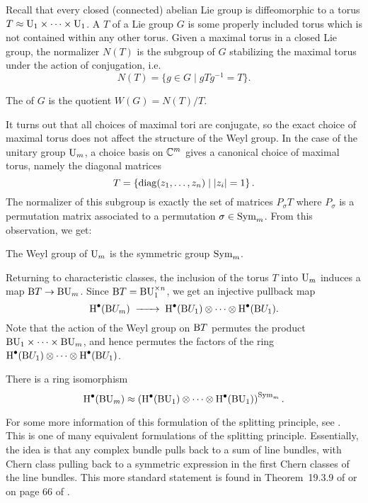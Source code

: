 Recall that every closed (connected) abelian Lie group is diffeomorphic to a torus $T \approx \mathrm{U}_1\times \cdots\times \mathrm{U}_1$. A  $T$ of a Lie group $G$ is some properly included torus which is not contained within any other torus. Given a maximal torus in a closed Lie group, the normalizer $N(T)$ is the subgroup of $G$ stabilizing the maximal torus under the action of conjugation, i.e. 
\[
	N(T) = \{ g \in G \mid gTg^{-1} = T\}.
\]
\begin{definition}
	The  of $G$ is the quotient $W(G)=N(T)/T$.
\end{definition}
It turns out that all choices of maximal tori are conjugate, so the exact choice of maximal torus does not affect the structure of the Weyl group.
In the case of the unitary group $\mathrm{U}_m$, a choice basis on $\mathbb{C}^m$ gives a canonical choice of maximal torus, namely the diagonal matrices
\[
	T = \left\{\mathrm{diag}(z_1,\ldots, z_n) \mid |z_i|=1\right\}.
\]
The normalizer of this subgroup is exactly the set of matrices $P_\sigma T$ where $P_\sigma$ is a permutation matrix associated to a permutation $\sigma\in \mathrm{Sym}_m$. From this observation, we get:
\begin{proposition}
	The Weyl group of $\mathrm{U}_m$ is the symmetric group $\mathrm{Sym}_m$.
\end{proposition}

Returning to characteristic classes, the inclusion of the torus $T$ into $\mathrm{U}_m$ induces a map $\mathrm{B} T \to \mathrm{BU}_m$. 
Since $\mathrm{B} T = \mathrm{BU}_1^{\times n}$, we get an injective pullback map
\[
		\H^\bullet(\BB U_m) \lkxto \H^\bullet(\BB U_1)\otimes \cdots \otimes \H^\bullet(\BB U_1).
\]
Note that the action of the Weyl group on $\mathrm{B} T$ permutes the product $\mathrm{BU}_1\times \cdots\times \mathrm{BU}_m$, and hence permutes the factors of the ring $\operatorname{H}^\bullet(\mathrm{B} U_1)\otimes \cdots\otimes \operatorname{H}^\bullet(\mathrm{B} U_1)$.

\begin{theorem}
	There is a ring isomorphism \[\operatorname{H}^\bullet(\mathrm{BU}_m)\approx \left(\operatorname{H}^\bullet(\mathrm{BU}_1)\otimes \cdots\otimes \operatorname{H}^\bullet(\mathrm{BU}_1)\right)^{\mathrm{Sym}_m}.\]
\end{theorem}

For some more information of this formulation of the splitting principle, see \cite{toda1987}. This is one of many equivalent formulations of the splitting principle. Essentially, the idea is that any complex bundle pulls back to a sum of line bundles, with Chern class pulling back to a symmetric expression in the first Chern classes of the line bundles.
This more standard statement is found in Theorem~19.3.9 of \cite{dieck2008algebraic} or on page 66 of \cite{hatcher2003ktheory}.

